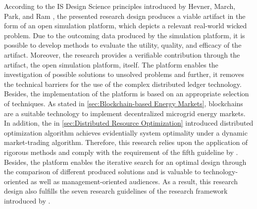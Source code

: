 According to the IS Design Science principles introduced by Hevner, March, Park, and Ram , 
the presented research design produces a viable artifact in the form of an open simulation platform, which depicts a 
relevant real-world wicked problem. Due to the outcoming data produced by the simulation platform, 
it is possible to develop methods to evaluate the utility, quality, and efficacy of the artifact. 
Moreover, the research provides a verifiable contribution through the artifact, the open simulation platform, itself. 
The platform enables the investigation of possible solutions to unsolved problems and further, 
it removes the technical barriers for the use of the complex distributed ledger technology. 
Besides, the implementation of the platform is based on an appropriate selection of techniques. 
As stated in \ref{sec:Blockchain-based Energy Markets}, 
blockchains are a suitable technology to implement decentralized microgrid energy markets. 
In addition, the in \ref{sec:Distributed Resource Optimization} introduced distributed optimization 
algorithm achieves evidentially system optimality under a dynamic market-trading algorithm. 
Therefore, this research relies upon the application of rigorous methods and comply with the requirement 
of the fifth guideline by . 
Besides, the platform enables the iterative search for an optimal design through the comparison 
of different produced solutions and is valuable to technology-oriented as well as management-oriented 
audiences. As a result, this research design also fulfills the seven research guidelines of 
the research framework introduced by . 
